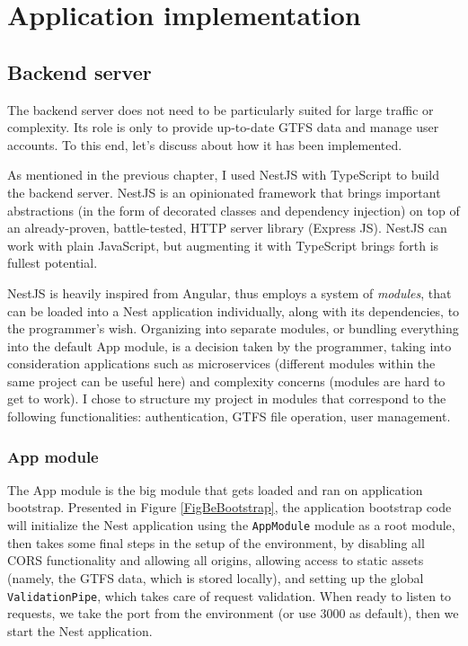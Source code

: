\chapter{Application implementation}

\section{Backend server}

The backend server does not need to be particularly suited for large traffic or complexity. Its role is only to provide up-to-date GTFS data and manage user accounts. To this end, let's discuss about how it has been implemented.

As mentioned in the previous chapter, I used NestJS with TypeScript to build the backend server. NestJS is an opinionated framework that brings important abstractions (in the form of decorated classes and dependency injection) on top of an already-proven, battle-tested, HTTP server library (Express JS). NestJS can work with plain JavaScript, but augmenting it with TypeScript brings forth is fullest potential.

NestJS is heavily inspired from Angular, thus employs a system of \textit{modules}, that can be loaded into a Nest application individually, along with its dependencies, to the programmer's wish. Organizing into separate modules, or bundling everything into the default App module, is a decision taken by the programmer, taking into consideration applications such as microservices (different modules within the same project can be useful here) and complexity concerns (modules are hard to get to work). I chose to structure my project in modules that correspond to the following functionalities: authentication, GTFS file operation, user management.

\subsection{App module}
\label{sec:AppModule}

The App module is the big module that gets loaded and ran on application bootstrap. Presented in Figure \ref{FigBeBootstrap}, the application bootstrap code will initialize the Nest application using the \verb|AppModule| module as a root module, then takes some final steps in the setup of the environment, by disabling all CORS functionality and allowing all origins, allowing access to static assets (namely, the GTFS data, which is stored locally), and setting up the global \verb|ValidationPipe|, which takes care of request validation. When ready to listen to requests, we take the port from the environment (or use 3000 as default), then we start the Nest application.

